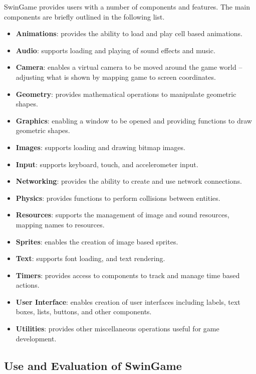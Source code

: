 SwinGame provides users with a number of components and features. The main components are briefly outlined in the following list.
\begin{itemize}[noitemsep,nolistsep]
  \item \textbf{Animations}: provides the ability to load and play cell based animations.
  \item \textbf{Audio}: supports loading and playing of sound effects and music.
  \item \textbf{Camera}: enables a virtual camera to be moved around the game world -- adjusting what is shown by mapping game to screen coordinates.
  \item \textbf{Geometry}: provides mathematical operations to manipulate geometric shapes.
  \item \textbf{Graphics}: enabling a window to be opened and providing functions to draw geometric shapes.
  \item \textbf{Images}: supports loading and drawing bitmap images.
  \item \textbf{Input}: supports keyboard, touch, and accelerometer input.
  \item \textbf{Networking}: provides the ability to create and use network connections.
  \item \textbf{Physics}: provides functions to perform collisions between entities.
  \item \textbf{Resources}: supports the management of image and sound resources, mapping names to resources.
  \item \textbf{Sprites}: enables the creation of image based sprites.
  \item \textbf{Text}: supports font loading, and text rendering.
  \item \textbf{Timers}: provides access to components to track and manage time based actions.
  \item \textbf{User Interface}: enables creation of user interfaces including labels, text boxes, lists, buttons, and other components.
  \item \textbf{Utilities}: provides other miscellaneous operations useful for game development.
\end{itemize}


\subsection{Use and Evaluation of SwinGame} %
\label{sub:use_of_swingame}

